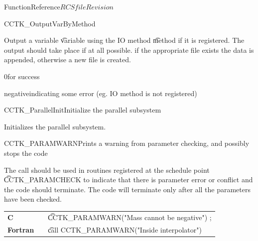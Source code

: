 \begin{cactuspart}{FunctionReference}{$RCSfile$}{$Revision$}
\begin{FunctionDescription}{CCTK\_OutputVarByMethod}
\begin{Discussion}
Output a variable {\t variable} using the IO method {\t method} if it is
registered. The output should take place if at all possible.
if the appropriate file exists the data is appended, otherwise a new
file is created.
\end{Discussion}

\begin{ErrorSection}
\begin{Error}{\rm 0}for success\end{Error}
\begin{Error}{negative}indicating some error (eg. IO method is not registered)\end{Error}
\end{ErrorSection}
\end{FunctionDescription}




\begin{CCTKFunc}{CCTK\_ParallelInit}{Initialize the parallel subsystem}
\label{CCTK-ParallelInit}
\showcargs
\begin{params}
\end{params}
\begin{discussion}
Initializes the parallel subsystem.
\end{discussion}
\end{CCTKFunc}


\begin{CCTKFunc}{CCTK\_PARAMWARN}{Prints a warning from parameter checking, and possibly stops the code}
\label{CCTK-PARAMWARN}
\subroutine{}{}{}
\showargs
\begin{params}
\end{params}
\begin{discussion}
The call should be used in routines registered at the schedule point {\t CCTK\_PARAMCHECK}
to indicate that there is parameter error or conflict and the code should
terminate. The code will terminate only after all the parameters have been
checked.
\end{discussion}
\begin{examples}
\begin{tabular}{@{}p{3cm}cp{11cm}}
\hfill {\bf C} && {\t CCTK\_PARAMWARN("Mass cannot be negative") };
\\
\hfill {\bf Fortran} && {\t call  CCTK\_PARAMWARN("Inside interpolator")}
\\
\end{tabular}
\end{examples}
\begin{errorcodes}
\end{errorcodes}
\end{CCTKFunc}



\end{cactuspart}
